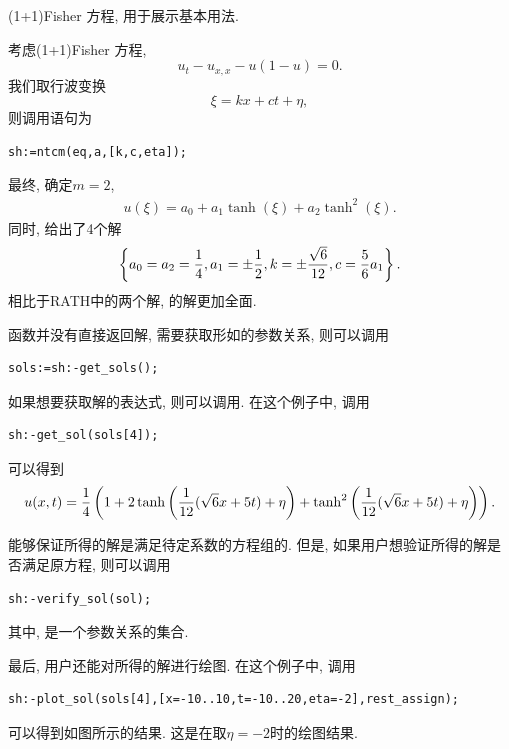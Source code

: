 \begin{example}(1+1)Fisher 方程, 用于展示基本用法.

考虑(1+1)Fisher 方程\cite{guo1991analytic},
\begin{equation}
    u_t-u_{x,x}-u(1-u)=0.
\end{equation}
我们取行波变换 
\begin{equation}
    \xi=kx+ct+\eta, 
\end{equation}
则调用语句为
\begin{verbatim}
sh:=ntcm(eq,a,[k,c,eta]);
\end{verbatim}
最终, 确定$m=2$,
\begin{eqnarray}
    u(\xi)=a_0+a_1 \tanh(\xi)+a_2\tanh^2(\xi).
\end{eqnarray}
同时, 给出了4个解
\begin{equation}
    \left\{a_0=a_2=\frac{1}{4},a_1=\pm \frac{1}{2},k=\pm \frac{\sqrt 6}{12},c=\frac{5}{6}a_1\right\}. \label{para-rel}
\end{equation}
相比于RATH\cite[p35]{liu2001master}中的两个解, 的解更加全面.


函数并没有直接返回解, 需要获取形如的参数关系, 则可以调用
\begin{verbatim}
sols:=sh:-get_sols();
\end{verbatim}

如果想要获取解的表达式, 则可以调用. 在这个例子中, 调用
\begin{verbatim}
sh:-get_sol(sols[4]);
\end{verbatim}
可以得到
\begin{equation}
    u(x,t)=\frac{1}{4}\left(1+2\tanh\left(\frac{1}{12}(\sqrt{6}x+5t)+\eta\right)+\tanh^2\left(\frac{1}{12}(\sqrt{6}x+5t)+\eta\right)\right). \label{fisher-sol-4}
\end{equation}

能够保证所得的解是满足待定系数的方程组的. 但是, 如果用户想验证所得的解是否满足原方程, 则可以调用
\begin{verbatim}
sh:-verify_sol(sol);
\end{verbatim}
其中, 是一个参数关系的集合.

最后, 用户还能对所得的解进行绘图. 在这个例子中, 调用
\begin{verbatim}
sh:-plot_sol(sols[4],[x=-10..10,t=-10..20,eta=-2],rest_assign);
\end{verbatim}
可以得到如图所示的结果. 这是在取$\eta=-2$时的绘图结果. 
    
\end{example}

